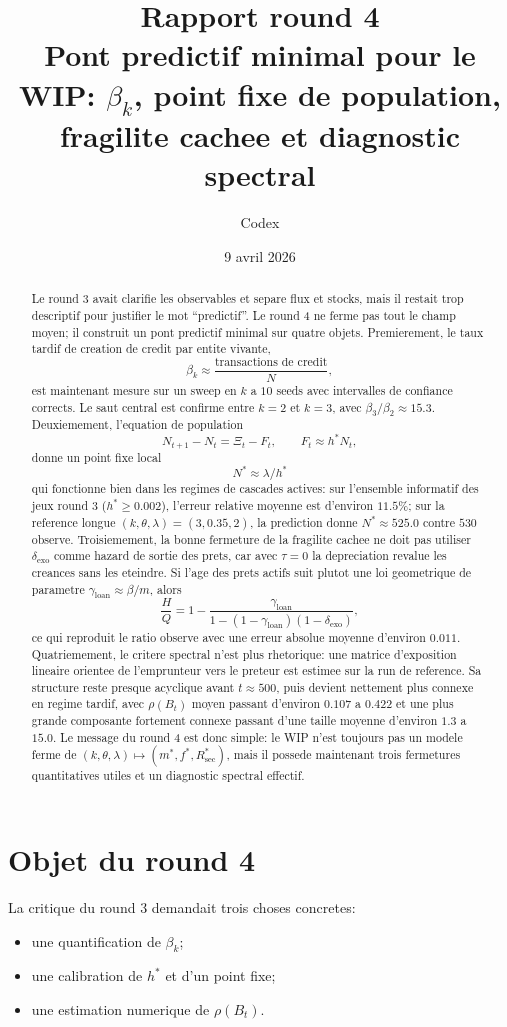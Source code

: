\documentclass[11pt,a4paper]{article}
\title{Rapport round 4\\
\large Pont predictif minimal pour le WIP: $\beta_k$, point fixe de population, fragilite cachee et diagnostic spectral}
\author{Codex}
\date{9 avril 2026}
\begin{document}
\maketitle

\begin{abstract}
Le round 3 avait clarifie les observables et separe flux et stocks, mais il restait trop descriptif pour justifier le mot ``predictif''. Le round 4 ne ferme pas tout le champ moyen; il construit un pont predictif minimal sur quatre objets. Premierement, le taux tardif de creation de credit par entite vivante,
\[
\beta_k \approx \frac{\text{transactions de credit}}{N},
\]
est maintenant mesure sur un sweep en $k$ a $10$ seeds avec intervalles de confiance corrects. Le saut central est confirme entre $k=2$ et $k=3$, avec $\beta_3/\beta_2 \approx 15.3$. Deuxiemement, l'equation de population
\[
N_{t+1}-N_t=\Xi_t-F_t,\qquad F_t \approx h^*N_t,
\]
donne un point fixe local
\[
N^* \approx \lambda / h^*
\]
qui fonctionne bien dans les regimes de cascades actives: sur l'ensemble informatif des jeux round 3 ($h^*\ge 0.002$), l'erreur relative moyenne est d'environ $11.5\%$; sur la reference longue $(k,\theta,\lambda)=(3,0.35,2)$, la prediction donne $N^* \approx 525.0$ contre $530$ observe. Troisiemement, la bonne fermeture de la fragilite cachee ne doit pas utiliser $\delta_{\mathrm{exo}}$ comme hazard de sortie des prets, car avec $\tau=0$ la depreciation revalue les creances sans les eteindre. Si l'age des prets actifs suit plutot une loi geometrique de parametre $\gamma_{\mathrm{loan}} \approx \beta/m$, alors
\[
\frac{H}{Q}
=
1-\frac{\gamma_{\mathrm{loan}}}{1-(1-\gamma_{\mathrm{loan}})(1-\delta_{\mathrm{exo}})},
\]
ce qui reproduit le ratio observe avec une erreur absolue moyenne d'environ $0.011$. Quatriemement, le critere spectral n'est plus rhetorique: une matrice d'exposition lineaire orientee de l'emprunteur vers le preteur est estimee sur la run de reference. Sa structure reste presque acyclique avant $t\approx 500$, puis devient nettement plus connexe en regime tardif, avec $\rho(B_t)$ moyen passant d'environ $0.107$ a $0.422$ et une plus grande composante fortement connexe passant d'une taille moyenne d'environ $1.3$ a $15.0$. Le message du round 4 est donc simple: le WIP n'est toujours pas un modele ferme de $(k,\theta,\lambda)\mapsto(m^*,f^*,R_{\mathrm{sec}}^*)$, mais il possede maintenant trois fermetures quantitatives utiles et un diagnostic spectral effectif.
\end{abstract}

\section{Objet du round 4}
La critique du round 3 demandait trois choses concretes:
\begin{itemize}
\item une quantification de $\beta_k$;
\item une calibration de $h^*$ et d'un point fixe;
\item une estimation numerique de $\rho(B_t)$.
\end{itemize}
\end{document}
